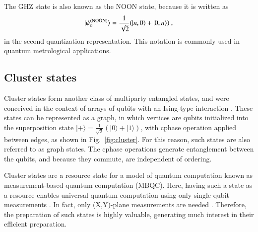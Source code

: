\documentclass[times,final]{elsarticle}
\newcommand{\ket}[1]{|#1\rangle}
\begin{document}
The GHZ state is also known as the NOON state, because it is written as
\begin{align}
\ket{\psi^{\rm (NOON)}_n}=\frac{1}{\sqrt{2}}(\ket{n,0}+\ket{0,n})\ ,
\end{align}
in the second quantization representation. This notation is commonly used in quantum metrological applications.

\subsection{Cluster states}\label{section:cluster}

Cluster states form another class of multiparty entangled states, and were conceived in the context of arrays of qubits with an Ising-type interaction \cite{bib:Briegel01}. These states can be represented as a graph, in which vertices are qubits initialized into the superposition state $\ket{+}=\frac{1}{\sqrt{2}}(\ket{0}+\ket{1})$, with {\sc cphase} operation applied between edges, as shown in Fig.~\ref{fig:cluster}. For this reason, such states are also referred to as graph states. The {\sc cphase} operations generate entanglement between the qubits, and because they commute, are independent of ordering.

Cluster states are a resource state for a model of quantum computation known as measurement-based quantum computation (MBQC). Here, having such a state as a resource enables universal quantum computation using only single-qubit measurements \cite{bib:Raussendorf03}. In fact, only (X,Y)-plane measurements are needed \cite{bib:Mantri17}. Therefore, the preparation of such states is highly valuable, generating much interest in their efficient preparation.
\end{document}
